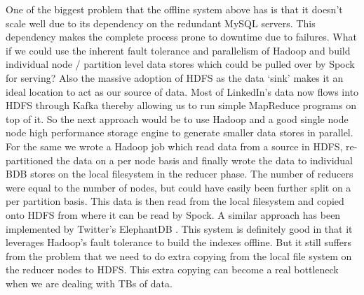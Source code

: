 \documentclass[twocolumn]{article}
\newcommand{\projectname}{Spock}
\begin{document}
One of the biggest problem that the offline system above has is that it doesn't scale well due to its dependency on the redundant MySQL servers. This dependency makes the complete process prone to downtime due to failures. What if we could use the inherent fault tolerance and parallelism of Hadoop and build individual node / partition level data stores which could be pulled over by \projectname{} for serving? Also the massive adoption of HDFS as the data `sink' makes it an ideal location to act as our source of data. Most of LinkedIn's data now flows into HDFS through Kafka thereby allowing us to run simple MapReduce programs on top of it. So the next approach would be to use Hadoop and a good single node node high performance storage engine to generate smaller data stores in parallel. For the same we wrote a Hadoop job which read data from a source in HDFS, re-partitioned the data on a per node basis and finally wrote the data to individual BDB stores on the local filesystem in the reducer phase. The number of reducers were equal to the number of nodes, but could have easily been further split on a per partition basis. This data is then read from the local filesystem and copied onto HDFS from where it can be read by \projectname{}. A similar approach has been implemented by Twitter's ElephantDB \cite{elephantdb}. This system is definitely good in that it leverages Hadoop's fault tolerance to build the indexes offline. But it still suffers from the problem that we need to do extra copying from the local file system on the reducer nodes to HDFS. This extra copying can become a real bottleneck when we are dealing with TBs of data. 
\end{document}
